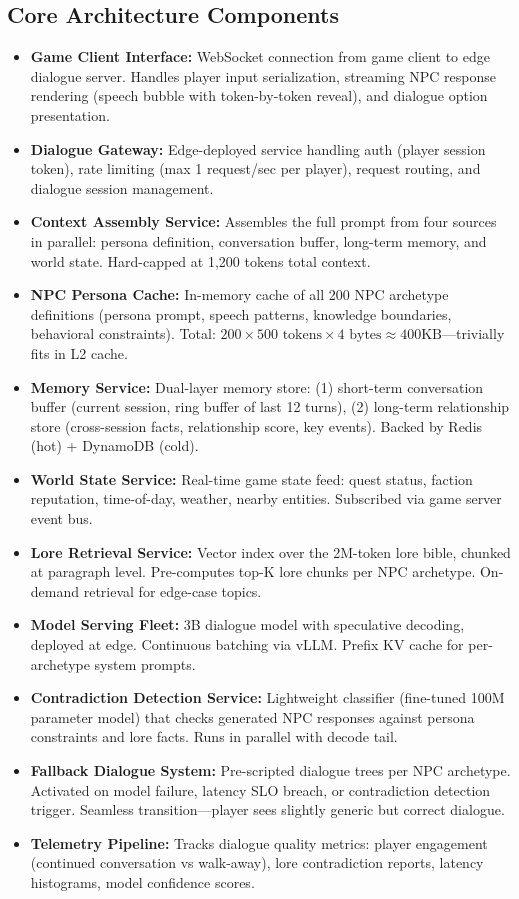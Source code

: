 \subsection*{Core Architecture Components}
\begin{itemize}
  \item \textbf{Game Client Interface:} WebSocket connection from game client to edge dialogue server. Handles player input serialization, streaming NPC response rendering (speech bubble with token-by-token reveal), and dialogue option presentation.
  \item \textbf{Dialogue Gateway:} Edge-deployed service handling auth (player session token), rate limiting (max 1 request/sec per player), request routing, and dialogue session management.
  \item \textbf{Context Assembly Service:} Assembles the full prompt from four sources in parallel: persona definition, conversation buffer, long-term memory, and world state. Hard-capped at 1,200 tokens total context.
  \item \textbf{NPC Persona Cache:} In-memory cache of all 200 NPC archetype definitions (persona prompt, speech patterns, knowledge boundaries, behavioral constraints). Total: $200 \times 500 \text{ tokens} \times 4 \text{ bytes} \approx 400\text{KB}$---trivially fits in L2 cache.
  \item \textbf{Memory Service:} Dual-layer memory store: (1) short-term conversation buffer (current session, ring buffer of last 12 turns), (2) long-term relationship store (cross-session facts, relationship score, key events). Backed by Redis (hot) + DynamoDB (cold).
  \item \textbf{World State Service:} Real-time game state feed: quest status, faction reputation, time-of-day, weather, nearby entities. Subscribed via game server event bus.
  \item \textbf{Lore Retrieval Service:} Vector index over the 2M-token lore bible, chunked at paragraph level. Pre-computes top-K lore chunks per NPC archetype. On-demand retrieval for edge-case topics.
  \item \textbf{Model Serving Fleet:} 3B dialogue model with speculative decoding, deployed at edge. Continuous batching via vLLM. Prefix KV cache for per-archetype system prompts.
  \item \textbf{Contradiction Detection Service:} Lightweight classifier (fine-tuned 100M parameter model) that checks generated NPC responses against persona constraints and lore facts. Runs in parallel with decode tail.
  \item \textbf{Fallback Dialogue System:} Pre-scripted dialogue trees per NPC archetype. Activated on model failure, latency SLO breach, or contradiction detection trigger. Seamless transition---player sees slightly generic but correct dialogue.
  \item \textbf{Telemetry Pipeline:} Tracks dialogue quality metrics: player engagement (continued conversation vs walk-away), lore contradiction reports, latency histograms, model confidence scores.
\end{itemize}


